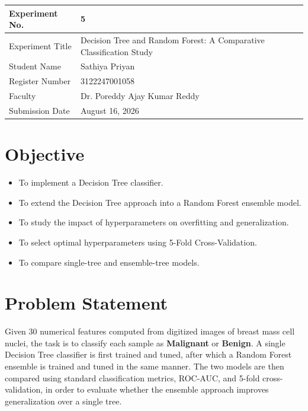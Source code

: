 \documentclass[12pt,a4paper]{article}
\begin{document}
\begin{tabular}{|p{4cm}|p{11cm}|}
\hline
Experiment No. & 5 \\ \hline
Experiment Title & Decision Tree and Random Forest: A Comparative Classification Study \\ \hline
Student Name & Sathiya Priyan \\ \hline
Register Number & 3122247001058 \\ \hline
Faculty & Dr. Poreddy Ajay Kumar Reddy \\ \hline
Submission Date & August 16, 2026\\ \hline
\end{tabular}

\section{Objective}
\begin{itemize}[nosep]
\item To implement a Decision Tree classifier.
\item To extend the Decision Tree approach into a Random Forest ensemble model.
\item To study the impact of hyperparameters on overfitting and generalization.
\item To select optimal hyperparameters using 5-Fold Cross-Validation.
\item To compare single-tree and ensemble-tree models.
\end{itemize}

\section{Problem Statement}
Given 30 numerical features computed from digitized images of breast mass cell nuclei, the task is to classify each sample as \textbf{Malignant} or \textbf{Benign}. A single Decision Tree classifier is first trained and tuned, after which a Random Forest ensemble is trained and tuned in the same manner. The two models are then compared using standard classification metrics, ROC-AUC, and 5-fold cross-validation, in order to evaluate whether the ensemble approach improves generalization over a single tree.
\end{document}
